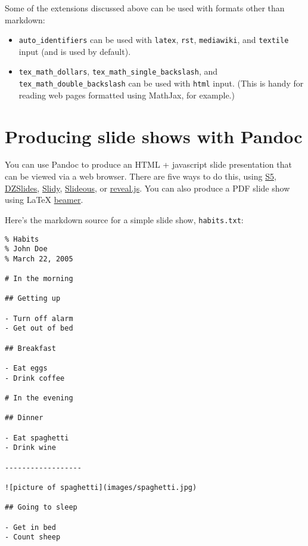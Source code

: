 \documentclass[]{article}
\begin{document}
Some of the extensions discussed above can be used with formats other
than markdown:

\begin{itemize}
\item
  \texttt{auto\_identifiers} can be used with \texttt{latex},
  \texttt{rst}, \texttt{mediawiki}, and \texttt{textile} input (and is
  used by default).
\item
  \texttt{tex\_math\_dollars}, \texttt{tex\_math\_single\_backslash},
  and \texttt{tex\_math\_double\_backslash} can be used with
  \texttt{html} input. (This is handy for reading web pages formatted
  using MathJax, for example.)
\end{itemize}

\section{Producing slide shows with
Pandoc}\label{producing-slide-shows-with-pandoc}

You can use Pandoc to produce an HTML + javascript slide presentation
that can be viewed via a web browser. There are five ways to do this,
using \href{http://meyerweb.com/eric/tools/s5/}{S5},
\href{http://paulrouget.com/dzslides/}{DZSlides},
\href{http://www.w3.org/Talks/Tools/Slidy/}{Slidy},
\href{http://goessner.net/articles/slideous/}{Slideous}, or
\href{http://lab.hakim.se/reveal-js/}{reveal.js}. You can also produce a
PDF slide show using LaTeX
\href{http://www.tex.ac.uk/CTAN/macros/latex/contrib/beamer}{beamer}.

Here's the markdown source for a simple slide show, \texttt{habits.txt}:

\begin{verbatim}
% Habits
% John Doe
% March 22, 2005

# In the morning

## Getting up

- Turn off alarm
- Get out of bed

## Breakfast

- Eat eggs
- Drink coffee

# In the evening

## Dinner

- Eat spaghetti
- Drink wine

------------------

![picture of spaghetti](images/spaghetti.jpg)

## Going to sleep

- Get in bed
- Count sheep
\end{verbatim}
\end{document}
